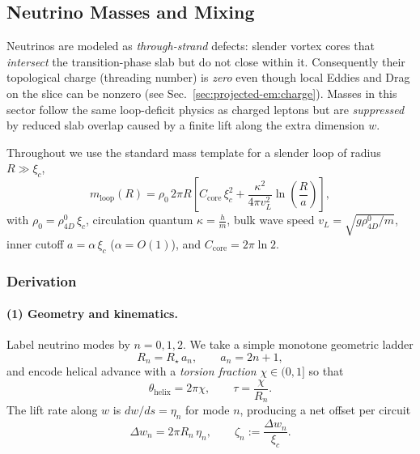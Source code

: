 \subsection{Neutrino Masses and Mixing}

Neutrinos are modeled as \emph{through-strand} defects: slender vortex cores that \emph{intersect} the transition-phase slab but do not close within it. Consequently their topological charge (threading number) is \emph{zero} even though local Eddies and Drag on the slice can be nonzero (see Sec.~\ref{sec:projected-em:charge}). Masses in this sector follow the same loop-deficit physics as charged leptons but are \emph{suppressed} by reduced slab overlap caused by a finite lift along the extra dimension $w$.

Throughout we use the standard mass template for a slender loop of radius $R\gg \xi_c$,
\begin{equation}
\label{eq:nu:mass-template}
m_{\text{loop}}(R)
=\rho_0\,2\pi R\left[
C_{\mathrm{core}}\,\xi_c^2
+\frac{\kappa^2}{4\pi v_L^2}\ln\!\left(\frac{R}{a}\right)\right],
\end{equation}
with $\rho_0=\rho_{4D}^0\,\xi_c$, circulation quantum $\kappa=\frac{h}{m}$, bulk wave speed $v_L=\sqrt{g\rho_{4D}^0/m}$, inner cutoff $a=\alpha\,\xi_c$ ($\alpha=O(1)$), and $C_{\mathrm{core}}=2\pi\ln 2$.

\subsubsection{Derivation}

\paragraph{(1) Geometry and kinematics.}
Label neutrino modes by $n=0,1,2$. We take a simple monotone geometric ladder
\begin{equation}
R_n=R_\star\,a_n,\qquad a_n=2n+1,
\end{equation}
and encode helical advance with a \emph{torsion fraction} $\chi\in(0,1]$ so that
\begin{equation}
\theta_{\mathrm{helix}}=2\pi\chi,\qquad \tau=\frac{\chi}{R_n}.
\end{equation}
The lift rate along $w$ is $dw/ds=\eta_n$ for mode $n$, producing a net offset per circuit
\begin{equation}
\Delta w_n=2\pi R_n\,\eta_n,\qquad
\zeta_n:=\frac{\Delta w_n}{\xi_c}.
\end{equation}

